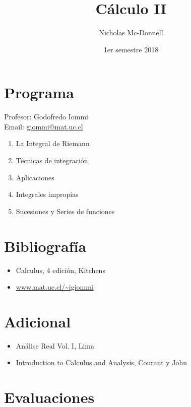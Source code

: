 \documentclass[11pt]{book}
\title{Cálculo II}
\author{Nicholas Mc-Donnell}
\date{1er semestre 2018}
\begin{document}
    \maketitle

    \newpage
    \hfill
    \newpage
    \section*{Programa}
    {\raggedleft Profesor: Godofredo Iommi}\\
    Email: \url{giommi@mat.uc.cl}
    \begin{enumerate}
        \item La Integral de Riemann

        \item Técnicas de integración

        \item Aplicaciones

        \item Integrales impropias

        \item Sucesiones y Series de funciones
    \end{enumerate}

    \section*{Bibliografía}
    \begin{itemize}
        \item Calculus, 4 edición, Kitchens

        \item \url{www.mat.uc.cl/~igiommi}

    \end{itemize}

    \section*{Adicional}
    \begin{itemize}
        \item Análise Real Vol. I, Lima

        \item Introduction to Calculus and Analysis, Courant y John
    \end{itemize}

    \section*{Evaluaciones}
        
\end{document}
